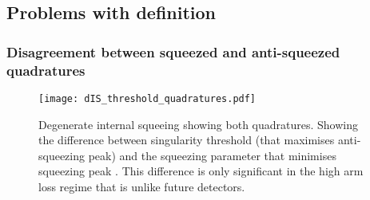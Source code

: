 \subsection{Problems with definition}




\subsubsection{Disagreement between squeezed and anti-squeezed quadratures}


\begin{figure}
	\centering
	\texttt{[image: dIS\_threshold\_quadratures.pdf]}
	\caption{  Degenerate internal squeeing showing both quadratures. Showing the difference between singularity threshold (that maximises anti-squeezing peak) and the squeezing parameter that minimises squeezing peak . This difference is only significant in the high arm loss regime that is unlike future detectors. }
	\label{fig:dIS_on_threshold}
\end{figure}



